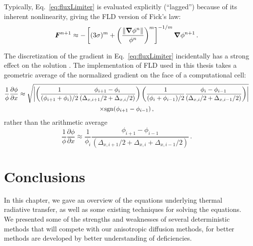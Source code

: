 Typically, Eq.~\eqref{eq:fluxLimiter} is evaluated explicitly (``lagged'')
because of its inherent nonlinearity, giving the FLD version of Fick's law:
\begin{equation*}
  \bm{F}^{n+1} \approx - \left[ (3\sigma)^{m} + \left( \frac{\left\| \bm{\nabla}
  \phi^{n} \right\|}{\phi^{n}} \right)^{m}\right]^{-1/m} \bm{\nabla} \phi^{n+1} \,.
\end{equation*}

The discretization of the gradient in Eq.~\eqref{eq:fluxLimiter} incidentally
has a strong effect on the solution \cite{Ols2007}. The implementation of FLD
used in this thesis takes a geometric average of the normalized gradient on the
face of a computational cell:
\begin{multline*}
 \frac{1}{\phi} \frac{\partial \phi}{\partial x}
  \approx
\sqrt{\left|  \left(  \frac{1}{(\phi_{i+1} + \phi_{i})/2} \frac{\phi_{i+1} - \phi_{i}}
 { (\Delta_{x,i+1}/2 + \Delta_{x,i}/2)} \right)
\left(  \frac{1}{(\phi_{i} + \phi_{i-1})/2} \frac{\phi_{i} - \phi_{i-1}}
{ (\Delta_{x,i}/2 + \Delta_{x,i-1}/2)} \right)  \right|}
\\
\times
 \mathrm{sgn}(\phi_{i+1} - \phi_{i-1})\,,
\end{multline*}
rather than the arithmetic average
\begin{equation*}
 \frac{1}{\phi} \frac{\partial \phi}{\partial x}
  \approx
 \frac{1}{\phi_{i}} \frac{\phi_{i+1} - \phi_{i-1}}
 { (\Delta_{x,i+1}/2 + \Delta_{x,i} + \Delta_{x,i-1}/2)}\,.
\end{equation*}

\section{Conclusions}

In this chapter, we gave an overview of the equations underlying thermal
radiative transfer, as well as some existing techniques for solving the
equations. We presented some of the strengths and weaknesses of several
deterministic methods that will compete with our anisotropic diffusion methods,
for better methods are developed by better understanding of deficiencies.

